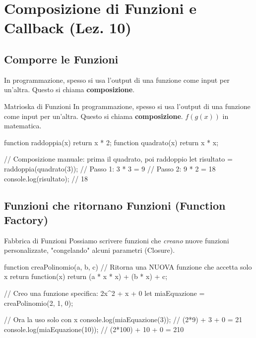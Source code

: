 \section{Composizione di Funzioni e Callback (Lez. 10)}

\subsection{Comporre le Funzioni}
In programmazione, spesso si usa l'output di una funzione come input per un'altra. Questo si chiama \textbf{composizione}.

\begin{concept}{Matrioska di Funzioni}
In programmazione, spesso si usa l'output di una funzione come input per un'altra. Questo si chiama \textbf{composizione}.
$f(g(x))$ in matematica.
\end{concept}
\begin{jsbox}
function raddoppia(x) { return x * 2; }
function quadrato(x) { return x * x; }

// Composizione manuale: prima il quadrato, poi raddoppio
let risultato = raddoppia(quadrato(3)); 
// Passo 1: 3 * 3 = 9
// Passo 2: 9 * 2 = 18
console.log(risultato); // 18
\end{jsbox}

\subsection{Funzioni che ritornano Funzioni (Function Factory)}
\begin{concept}{Fabbrica di Funzioni}
Possiamo scrivere funzioni che \textit{creano} nuove funzioni personalizzate, "congelando" alcuni parametri (Closure).
\end{concept}
\begin{jsbox}
function creaPolinomio(a, b, c) {
    // Ritorna una NUOVA funzione che accetta solo x
    return function(x) {
        return (a * x * x) + (b * x) + c;
    }
}

// Creo una funzione specifica: 2x^2 + x + 0
let miaEquazione = creaPolinomio(2, 1, 0);

// Ora la uso solo con x
console.log(miaEquazione(3)); // (2*9) + 3 + 0 = 21
console.log(miaEquazione(10)); // (2*100) + 10 + 0 = 210
\end{jsbox}
